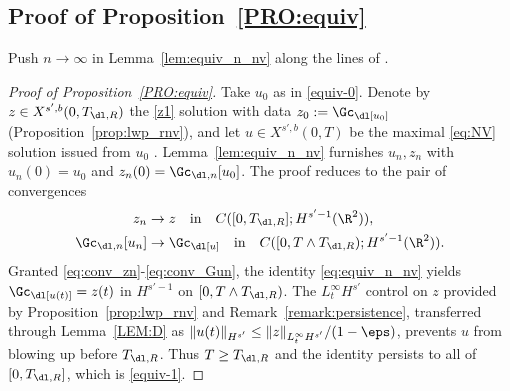 \subsection{Proof of Proposition~\ref{PRO:equiv}}

Push $n\to\infty$ in Lemma~\ref{lem:equiv_n_nv} along the lines of
\cite[Proof of Proposition~5.6]{chcora}.

\begin{proof}[Proof of Proposition~\textup{\ref{PRO:equiv}}]
Take $u_0$ as in \eqref{equiv-0}. Denote by
$z\in X^{s',b}(0,T_{\dl,R})$ the \eqref{z1} solution with data
$z_0:=\Gc_\dl[u_0]$ (Proposition~\ref{prop:lwp_rnv}), and let
$u\in X^{s',b}(0,T)$ be the maximal \eqref{eq:NV} solution issued
from $u_0$
\cite{angelopolous,kazeykinamunoz1,kazeykinamunoz2}. Lemma~\ref{lem:equiv_n_nv}
furnishes $u_n,z_n$ with $u_n(0)=u_0$ and
$z_n(0)=\Gc_{\dl,n}[u_0]$. The proof reduces to the pair of
convergences
\begin{align}
\label{eq:conv_zn}
z_n &\to z \quad\text{in}\quad C([0,T_{\dl,R}]; H^{s'-1}(\R^2)),
\\
\label{eq:conv_Gun}
\Gc_{\dl,n}[u_n] &\to \Gc_\dl[u]
\quad\text{in}\quad C([0,T\wedge T_{\dl,R}); H^{s'-1}(\R^2)).
\end{align}
Granted \eqref{eq:conv_zn}-\eqref{eq:conv_Gun}, the identity
\eqref{eq:equiv_n_nv} yields $\Gc_\dl[u(t)]=z(t)$ in $H^{s'-1}$ on
$[0,T\wedge T_{\dl,R})$. The $L^\infty_t H^{s'}$ control on $z$
provided by Proposition~\ref{prop:lwp_rnv} and
Remark~\ref{remark:persistence}, transferred through
Lemma~\ref{LEM:D} as
$\|u(t)\|_{H^{s'}}\le \|z\|_{L^\infty_t H^{s'}}/(1-\eps)$,
prevents $u$ from blowing up before $T_{\dl,R}$. Thus
$T\ge T_{\dl,R}$ and the identity persists to all of
$[0,T_{\dl,R}]$, which is \eqref{equiv-1}.


\end{proof}
